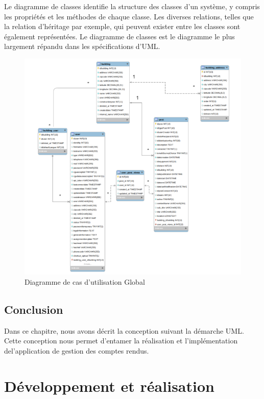 \documentclass[a4paper,10pt]{book}
\begin{document}
\par Le diagramme de classes identifie la structure des classes d’un système, y compris les
propriétés et les méthodes de chaque classe. Les diverses relations, telles que la relation
d’héritage par exemple, qui peuvent exister entre les classes sont également représentées.
Le diagramme de classes est le diagramme le plus largement répandu dans les spécifications
d’UML.
\vspace{3cm}
\begin{figure}[!h]
\centering 
\includegraphics[width=1\textwidth]{clss.png}
\caption{Diagramme de cas d’utilisation Global }
\label{fig4 }
\end{figure}


\vspace{3cm}

\section{Conclusion}
\par 
   Dans ce chapitre, nous avons décrit la conception suivant la démarche UML. 
   Cette conception nous permet d’entamer la réalisation et l’implémentation del’application de gestion des comptes rendus. 

 
\chapter{Développement et réalisation }
\par
\end{document}
